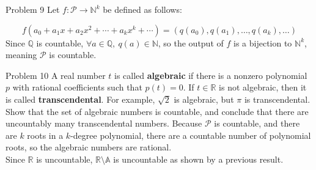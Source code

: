 \documentclass[10pt]{extarticle}
\begin{document}
{\begin{problem}{Problem 9}
    Let $f: \mathcal{P} \rightarrow \mathbb{N}^k$ be defined as follows:

    \[
      f(a_0 + a_1x + a_2x^2 + \cdots + a_kx^k + \cdots) = (q(a_0),q(a_1),\dots,q(a_k),\dots)
    \] 
    Since $\mathbb{Q}$ is countable, $\forall a\in \mathbb{Q},~q(a)\in \mathbb{N}$, so the output of $f$ is a bijection to $\mathbb{N}^k$, meaning $\mathcal{P}$ is countable.
  \end{problem}
  \begin{problem}{Problem 10}
    A real number $t$ is called \textbf{algebraic} if there is a nonzero polynomial $p$ with rational coefficients such that $p(t) = 0$. If $t\in \mathbb{R}$ is not algebraic, then it is called \textbf{transcendental}. For example, $\sqrt{2}$ is algebraic, but $\pi$ is transcendental. Show that the set of algebraic numbers is countable, and conclude that there are uncountably many transcendental numbers.
    \tcblower
    Because $\mathcal{P}$ is countable, and there are $k$ roots in a $k$-degree polynomial, there are a countable number of polynomial roots, so the algebraic numbers are rational.\\

    Since $\mathbb{R}$ is uncountable, $\mathbb{R}\setminus\mathbb{A}$ is uncountable as shown by a previous result.
  \end{problem}
}
\end{document}
